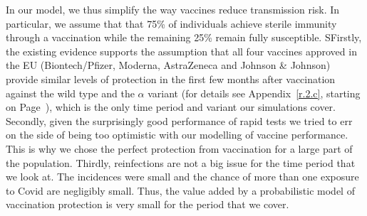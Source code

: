 \documentclass[a4paper,11pt]{article}
\theoremstyle{plain}
\begin{document}
{\begin{enumerate}
{              In our model, we thus simplify the way vaccines reduce transmission risk.
              In particular, we assume that that 75\% of individuals achieve sterile
              immunity through a vaccination while the remaining 25\% remain fully
              susceptible. SFirstly, the existing evidence supports the
              assumption that all four vaccines approved in the EU (Biontech/Pfizer,
              Moderna, AstraZeneca and Johnson \& Johnson) provide similar levels of
              protection in the first few months after vaccination against the wild type
              and the $\alpha$ variant (for details see Appendix~\ref{r.2.c}, starting
              on Page~\pageref{r.2.c}), which is the only time period and variant our
              simulations cover. Secondly, given the surprisingly good performance of
              rapid tests we tried to err on the side of being too optimistic with our
              modelling of vaccine performance. This is why we chose the perfect
              protection from vaccination for a large part of the population. Thirdly,
              reinfections are not a big issue for the time period that we look at. The
              incidences were small and the chance of more than one exposure to Covid
              are negligibly small. Thus, the value added by a probabilistic model of
              vaccination protection is very small for the period that we cover. }
\end{enumerate}
}

\begin{refcontext}[sorting=none]  %
    \printbibliography[heading=bibintoc]
\end{refcontext}
\end{document}
